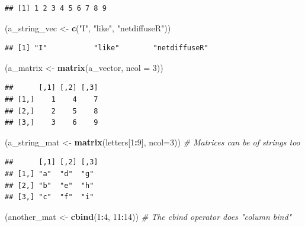 \documentclass[
]{book}
\newenvironment{Shaded}{\begin{snugshade}}{\end{snugshade}}
\newcommand{\AttributeTok}[1]{\textcolor[rgb]{0.13,0.29,0.53}{#1}}
\newcommand{\CommentTok}[1]{\textcolor[rgb]{0.56,0.35,0.01}{\textit{#1}}}
\newcommand{\DecValTok}[1]{\textcolor[rgb]{0.00,0.00,0.81}{#1}}
\newcommand{\FunctionTok}[1]{\textcolor[rgb]{0.13,0.29,0.53}{\textbf{#1}}}
\newcommand{\NormalTok}[1]{#1}
\newcommand{\OtherTok}[1]{\textcolor[rgb]{0.56,0.35,0.01}{#1}}
\newcommand{\SpecialCharTok}[1]{\textcolor[rgb]{0.81,0.36,0.00}{\textbf{#1}}}
\newcommand{\StringTok}[1]{\textcolor[rgb]{0.31,0.60,0.02}{#1}}
\begin{document}
\begin{enumerate}
\begin{verbatim}
## [1] 1 2 3 4 5 6 7 8 9
\end{verbatim}

\begin{Shaded}
\begin{Highlighting}[]
\NormalTok{(a\_string\_vec }\OtherTok{\textless{}{-}} \FunctionTok{c}\NormalTok{(}\StringTok{"I"}\NormalTok{, }\StringTok{"like"}\NormalTok{, }\StringTok{"netdiffuseR"}\NormalTok{))}
\end{Highlighting}
\end{Shaded}

\begin{verbatim}
## [1] "I"           "like"        "netdiffuseR"
\end{verbatim}

\begin{Shaded}
\begin{Highlighting}[]
\NormalTok{(a\_matrix     }\OtherTok{\textless{}{-}} \FunctionTok{matrix}\NormalTok{(a\_vector, }\AttributeTok{ncol =} \DecValTok{3}\NormalTok{))}
\end{Highlighting}
\end{Shaded}

\begin{verbatim}
##      [,1] [,2] [,3]
## [1,]    1    4    7
## [2,]    2    5    8
## [3,]    3    6    9
\end{verbatim}

\begin{Shaded}
\begin{Highlighting}[]
\NormalTok{(a\_string\_mat }\OtherTok{\textless{}{-}} \FunctionTok{matrix}\NormalTok{(letters[}\DecValTok{1}\SpecialCharTok{:}\DecValTok{9}\NormalTok{], }\AttributeTok{ncol=}\DecValTok{3}\NormalTok{)) }\CommentTok{\# Matrices can be of strings too}
\end{Highlighting}
\end{Shaded}

\begin{verbatim}
##      [,1] [,2] [,3]
## [1,] "a"  "d"  "g" 
## [2,] "b"  "e"  "h" 
## [3,] "c"  "f"  "i"
\end{verbatim}

\begin{Shaded}
\begin{Highlighting}[]
\NormalTok{(another\_mat  }\OtherTok{\textless{}{-}} \FunctionTok{cbind}\NormalTok{(}\DecValTok{1}\SpecialCharTok{:}\DecValTok{4}\NormalTok{, }\DecValTok{11}\SpecialCharTok{:}\DecValTok{14}\NormalTok{)) }\CommentTok{\# The \textasciigrave{}cbind\textasciigrave{} operator does "column bind"}
\end{Highlighting}
\end{Shaded}


\end{enumerate}
\end{document}
